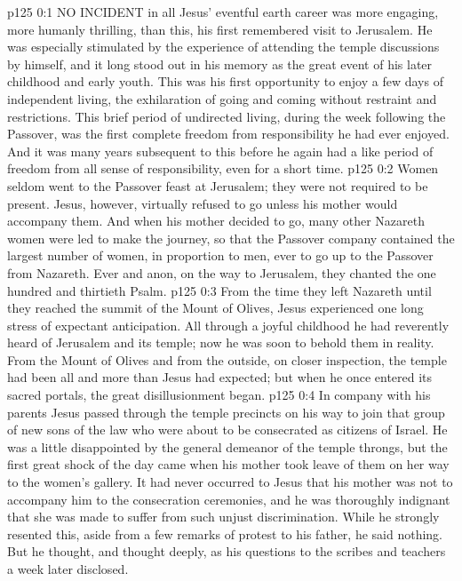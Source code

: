 \vs p125 0:1 NO INCIDENT in all Jesus’ eventful earth career was more engaging, more humanly thrilling, than this, his first remembered visit to Jerusalem. He was especially stimulated by the experience of attending the temple discussions by himself, and it long stood out in his memory as the great event of his later childhood and early youth. This was his first opportunity to enjoy a few days of independent living, the exhilaration of going and coming without restraint and restrictions. This brief period of undirected living, during the week following the Passover, was the first complete freedom from responsibility he had ever enjoyed. And it was many years subsequent to this before he again had a like period of freedom from all sense of responsibility, even for a short time.
\vs p125 0:2 \pc Women seldom went to the Passover feast at Jerusalem; they were not required to be present. Jesus, however, virtually refused to go unless his mother would accompany them. And when his mother decided to go, many other Nazareth women were led to make the journey, so that the Passover company contained the largest number of women, in proportion to men, ever to go up to the Passover from Nazareth. Ever and anon, on the way to Jerusalem, they chanted the one hundred and thirtieth Psalm.
\vs p125 0:3 From the time they left Nazareth until they reached the summit of the Mount of Olives, Jesus experienced one long stress of expectant anticipation. All through a joyful childhood he had reverently heard of Jerusalem and its temple; now he was soon to behold them in reality. From the Mount of Olives and from the outside, on closer inspection, the temple had been all and more than Jesus had expected; but when he once entered its sacred portals, the great disillusionment began.
\vs p125 0:4 In company with his parents Jesus passed through the temple precincts on his way to join that group of new sons of the law who were about to be consecrated as citizens of Israel. He was a little disappointed by the general demeanor of the temple throngs, but the first great shock of the day came when his mother took leave of them on her way to the women’s gallery. It had never occurred to Jesus that his mother was not to accompany him to the consecration ceremonies, and he was thoroughly indignant that she was made to suffer from such unjust discrimination. While he strongly resented this, aside from a few remarks of protest to his father, he said nothing. But he thought, and thought deeply, as his questions to the scribes and teachers a week later disclosed.
